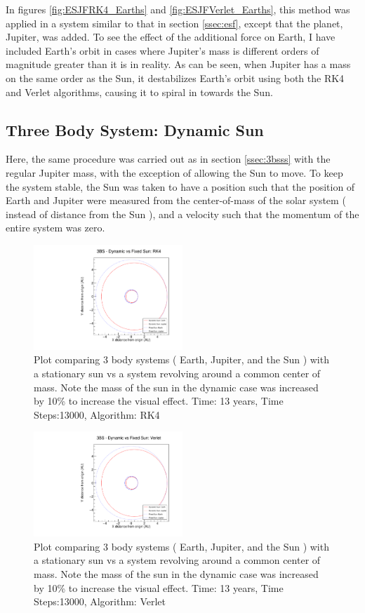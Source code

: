 \documentclass[a4paper,12pt]{report}
\begin{document}
In figures \ref{fig:ESJFRK4_Earths} and \ref{fig:ESJFVerlet_Earths}, this method was applied in a system similar to that in section \ref{ssec:esf}, except that the planet, Jupiter, was added. To see the effect of the additional force on Earth, I have included Earth's orbit in cases where Jupiter's mass is different orders of magnitude greater than it is in reality. As can be seen, when Jupiter has a mass on the same order as the Sun, it destabilizes Earth's orbit using both the RK4 and Verlet algorithms, causing it to spiral in towards the Sun. 
\subsection{Three Body System: Dynamic Sun}\label{ssec:3bsds}

Here, the same procedure was carried out as in section \ref{ssec:3bsss} with the regular Jupiter mass, with the exception of allowing the Sun to move. To keep the system stable, the Sun was taken to have a position such that the position of Earth and Jupiter were measured from the center-of-mass of the solar system ( instead of distance from the Sun ), and a velocity such that the momentum of the entire system was zero. 

 \begin{figure}
 \centering
   \includegraphics[width=0.5\textwidth]{ESJD_vs_ESJF_RK4.pdf}
  \caption{Plot comparing 3 body systems ( Earth, Jupiter, and the Sun ) with a stationary sun vs a system revolving around a common center of mass. Note the mass of the sun in the dynamic case was increased by 10\% to increase the visual effect. Time: 13 years, Time Steps:13000, Algorithm: RK4}
  \label{fig:ESJD_vs_ESJF_RK4}
 \end{figure}

 
  \begin{figure}
 \centering
   \includegraphics[width=0.5\textwidth]{ESJD_vs_ESJF_Verlet.pdf}
  \caption{Plot comparing 3 body systems ( Earth, Jupiter, and the Sun ) with a stationary sun vs a system revolving around a common center of mass. Note the mass of the sun in the dynamic case was increased by 10\% to increase the visual effect. Time: 13 years, Time Steps:13000, Algorithm: Verlet}
  \label{fig:ESJD_vs_ESJF_Verlet}
 \end{figure}
\end{document}
